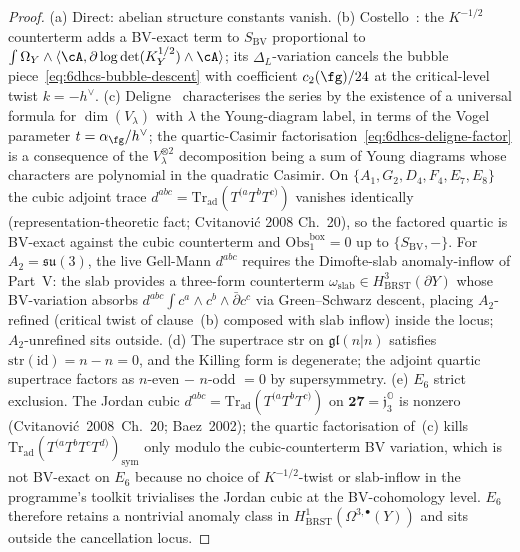 \begin{proof}
\textup{(a)} Direct: abelian structure constants vanish.
\textup{(b)} Costello~\cite[\S4]{Costello2013}: the $K^{-1/2}$
counterterm adds a BV-exact term to $S_{\mathrm{BV}}$ proportional
to
$\int\Omega_Y\wedge\langle\cA,\partial\log\det(K_Y^{1/2})\wedge\cA
\rangle$; its $\Delta_L$-variation cancels the bubble
piece~\eqref{eq:6dhcs-bubble-descent} with coefficient
$c_2(\fg)/24$ at the critical-level twist $k=-h^\vee$.
\textup{(c)} Deligne~\cite{Deligne1996} characterises the series
by the existence of a universal formula for $\dim(V_\lambda)$ with
$\lambda$ the Young-diagram label, in terms of the Vogel parameter
$t=\alpha_\fg/h^\vee$; the quartic-Casimir
factorisation~\eqref{eq:6dhcs-deligne-factor} is a consequence of
the $V_\lambda^{\otimes 2}$ decomposition being a sum of Young
diagrams whose characters are polynomial in the quadratic Casimir.
On $\{A_1,G_2,D_4,F_4,E_7,E_8\}$ the cubic adjoint trace
$d^{abc}=\mathrm{Tr}_{\mathrm{ad}}(T^{(a}T^bT^{c)})$ vanishes
identically (representation-theoretic fact; Cvitanović 2008
Ch.~20), so the factored quartic is BV-exact against the cubic
counterterm and $\mathrm{Obs}_1^{\mathrm{box}}=0$ up to
$\{S_{\mathrm{BV}},-\}$. For $A_2=\mathfrak{su}(3)$, the live
Gell-Mann $d^{abc}$ requires the Dimofte-slab anomaly-inflow
of Part~V: the slab provides a three-form counterterm
$\omega_{\mathrm{slab}}\in H^3_{\mathrm{BRST}}(\partial Y)$ whose
BV-variation absorbs $d^{abc}\int c^a\wedge c^b\wedge\bar\partial
c^c$ via Green--Schwarz descent, placing $A_2$-refined (critical
twist of clause~(b) composed with slab inflow) inside the
locus; $A_2$-unrefined sits outside.
\textup{(d)} The supertrace $\mathrm{str}$ on $\mathfrak{gl}(n|n)$
satisfies $\mathrm{str}(\mathrm{id})=n-n=0$, and the Killing form is
degenerate; the adjoint quartic supertrace factors as $n$-even
$-$ $n$-odd $=0$ by supersymmetry.
\textup{(e)} $E_6$ strict exclusion. The Jordan cubic
$d^{abc}=\mathrm{Tr}_{\mathrm{ad}}(T^{(a}T^bT^{c)})$ on
$\mathbf{27}=\mathfrak j_3^{\mathbb O}$ is nonzero
(Cvitanović~2008~Ch.~20; Baez~2002); the quartic factorisation
of~(c) kills
$\mathrm{Tr}_{\mathrm{ad}}(T^{(a}T^bT^cT^{d)})_{\mathrm{sym}}$ only
modulo the cubic-counterterm BV variation, which is not BV-exact on
$E_6$ because no choice of $K^{-1/2}$-twist or slab-inflow in the
programme's toolkit trivialises the Jordan cubic at the
BV-cohomology level. $E_6$ therefore retains a nontrivial anomaly
class in $H^1_{\mathrm{BRST}}(\Omega^{3,\bullet}(Y))$ and sits
outside the cancellation locus.
\end{proof}

